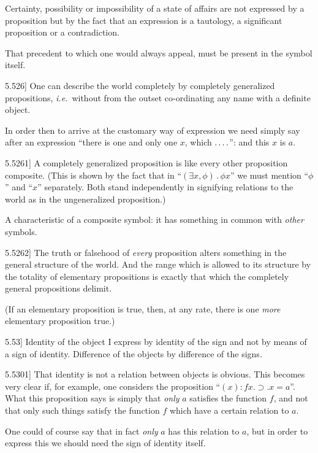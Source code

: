 \documentclass[12pt,oneside]{book}[2007/10/19]
\newcommand{\PropositionE}[2]{%
  \item[\phantomsection\label{PropE:#1}\PropGRef{#1}] #2%
}
\newcommand{\PropGRef}[1]{\hyperref[PropG:#1]{#1}}
\newcommand{\DotOp}{\mathbin{.}}
\newcommand{\Implies}{\supset}
\newcommand{\idEst}{\textit{i.e.}}
\newcommand{\fourdots}{\mathinner{\ldotp\ldotp\ldotp\ldotp}}
\begin{document}
\begin{propositions}
{Certainty, possibility or impossibility of a state
of affairs are not expressed by a proposition but
by the fact that an expression is a tautology, a
significant proposition or a contradiction.

That precedent to which one would always
appeal, must be present in the symbol itself.}


\PropositionE{5.526}
{One can describe the world completely by
completely generalized propositions, \idEst\ without
from the outset co-ordinating any name with a
definite object.

In order then to arrive at the customary way
of expression we need simply say after an expression
``there is one and only one $x$, which $\fourdots$'':
and this $x$ is $a$.}


\PropositionE{5.5261}
{A completely generalized proposition is like
every other proposition composite. (This is shown
by the fact that in ``$(\exists x, \phi) \DotOp \phi x$'' we must mention
``$\phi$'' and ``$x$'' separately. Both stand independently
in signifying relations to the world
as in the ungeneralized proposition.)

A characteristic of a composite symbol: it has
something in common with \emph{other} symbols.}


\PropositionE{5.5262}
{The truth or falsehood of \emph{every} proposition alters
something in the general structure of the world.
And the range which is allowed to its structure by
the totality of elementary propositions is exactly
that which the completely general propositions
delimit.

(If an elementary proposition is true, then, at
any rate, there is one \emph{more} elementary proposition
true.)}


\PropositionE{5.53}
{Identity of the object I express by identity of
the sign and not by means of a sign of identity.
Difference of the objects by difference of the
signs.}


\PropositionE{5.5301}
{That identity is not a relation between objects is
obvious. This becomes very clear if, for example,
one considers the proposition ``$(x) : fx \DotOp \Implies \DotOp x = a$''.
What this proposition says is simply that \emph{only}
$a$ satisfies the function $f$, and not that only such
things satisfy the function $f$ which have a certain
relation to $a$.

One could of course say that in fact \emph{only}
$a$ has this relation to $a$, but in order to express
this we should need the sign of identity itself.}



\end{propositions}
\end{document}
